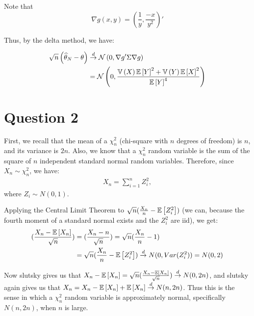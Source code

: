 \documentclass[12pt]{paper}
\begin{document}
Note that
\begin{equation*}
  \nabla g(x,y) = \left ( \frac{1}{y}, \frac{-x}{y^2} \right)'
\end{equation*}

Thus, by the delta method, we have:

\begin{align*}
  \sqrt{n} \left ( \widehat{ \theta }_{N} - \theta \right) &\overset{d}{\to} \mathcal{N} \left( 0, \nabla g' \Sigma \nabla
                                         g \right)\\
  &= \mathcal{N} \left( 0, \frac{\mathbb{V} \left ( X \right )\mathbb{E} \left [ Y \right ]^2 +
    \mathbb{V} \left ( Y \right )\mathbb{E} \left [ X \right ]^2}{\mathbb{E} \left [ Y \right ]^4} \right)
\end{align*}

\section*{Question 2}

First, we recall that the mean of a $\chi^2_n$ (chi-square with $n$
degrees of freedom) is $n$, and its variance is $2n$. Also, we know
that a $\chi^2_n$ random variable is the sum of the square of $n$
independent standard normal random variables. Therefore, since
$X_n\sim\chi^2_n$, we have:
\begin{equation}
\begin{split}
X_n=\sum_{i=1}^{n}{Z_i^2},
\end{split}
\end{equation}
\noindent where $Z_i\sim N(0,1)$.

Applying the Central Limit Theorem to
$\sqrt{n}(\frac{X_n}{n}-\mathbb{E} \left [ Z_i^2 \right ])$ (we can, because the fourth moment of a standard normal exists and the $Z_i^2$ are iid), we get:
\begin{equation}
\begin{split}
(\frac{X_n-\mathbb{E} \left [ X_n \right ]}{\sqrt{n}})&=(\frac{X_n-n}{\sqrt{n}})=\sqrt{n}(\frac{X_n}{n}-1) \\
&=\sqrt{n}(\frac{X_n}{n}-\mathbb{E} \left [ Z_i^2 \right ])\overset{d}{\to}N(0,Var(Z_i^2))=N(0,2)\\
\end{split}
\end{equation}

Now slutsky gives us that
$X_n-\mathbb{E} \left [ X_n \right ]=\sqrt{n}(\frac{X_n-\mathbb{E} \left [ X_n \right ]}{\sqrt{n}})\overset{d}{\to}N(0,2n)$,
and slutsky again gives us that
$X_n=X_n-\mathbb{E} \left [ X_n \right ]+\mathbb{E} \left [ X_n \right ]\overset{d}{\to}N(n,2n)$. Thus this is the
sense in which a $\chi_n^2$ random variable is approximately normal,
specifically $N(n,2n)$, when $n$ is large.
\end{document}
